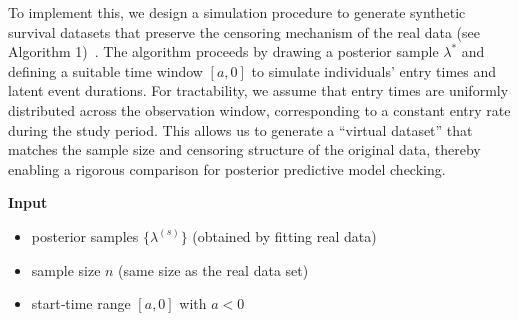 To implement this, we design a simulation procedure to generate synthetic survival datasets that preserve the censoring mechanism of the real data (see Algorithm 1)~\cite{ashhad2025generatingaccuratesyntheticsurvival}. The algorithm proceeds by drawing a posterior sample $\lambda^*$ and defining a suitable time window $[a, 0]$ to simulate individuals' entry times and latent event durations. For tractability, we assume that entry times are uniformly distributed across the observation window, corresponding to a constant entry rate during the study period. This allows us to generate a “virtual dataset” that matches the sample size and censoring structure of the original data, thereby enabling a rigorous comparison for posterior predictive model checking.
\begin{tcolorbox}[
  title  = {Algorithm 1: Simulating a Fake Survival Dataset (e.g., Posterior predictive model checking)},
  label={fake data},
   fonttitle  = \bfseries\footnotesize,
   fontupper=\footnotesize,
  box align = center, 
  colback = white,
  colframe=black,
   boxsep  = 3pt,
  left=4pt,
   right=4pt,
  top=5pt,
  bottom=4pt]
\textbf{Input}
\begin{itemize}[itemsep=1pt,parsep=0pt,topsep=2pt]
\item posterior samples $\{\lambda^{(s)}\}$ \hfill (obtained by fitting real data)
\item sample size $n$ \hfill (same size as the real data set)
\item start‑time range $[a,0]$ with $a<0$
\end{itemize}


\end{tcolorbox}
